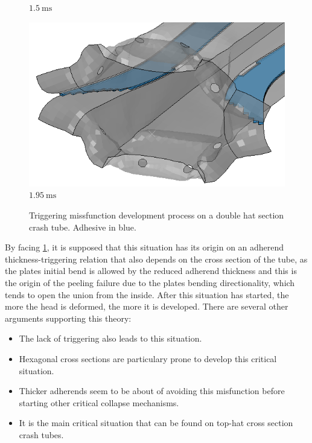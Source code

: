 \documentclass[
documentsize = a4, %
font = cmr, %
typesize = 11, %
printmode = true,
onehalfspacing = true,
language = en, %
titlepage = udciccp, %
degree = pt, %
dedication = true,
acknowledgements = true,
abstract-en = true,
abstract-es = false,
abstract-ga = false,
epigraphs = true,
toc = true,
lof = true,
lot = true,
frontmatterintoc = false,
notation = false,
minimal = false,
]{UDCthesis}
\begin{document}
\begin{figure}
\begin{minipage}[b]{.22\linewidth}
		$\SI{1.5}{\ms}$
	\end{minipage}
	\quad
	\begin{minipage}[b]{.22\linewidth}
		\centering
		\includegraphics[width=\linewidth]{IMG_CUTRES/tmf4}
		$\SI{1.95}{\ms}$
	\end{minipage}
	\caption[Triggering missfunction development process on a double hat section crash tube.]{Triggering missfunction development process on a double hat section crash tube. Adhesive in blue.}
	\label{fig:tmf}
\end{figure}

By facing \cref{fig:tmf}, it is supposed that this situation has its origin on an adherend thickness-triggering relation that also depends on the cross section of the tube, as the plates initial bend is allowed by the reduced adherend thickness and this is the origin of the peeling failure due to the plates bending directionality, which tends to open the union from the inside. After this situation has started, the more the head is deformed, the more it is developed. There are several other arguments supporting this theory:
\begin{itemize}
	\item The lack of triggering also leads to this situation.

	\item Hexagonal cross sections \citep{Yang2012} are particulary prone to develop this critical situation.

	\item Thicker adherends seem to be about of avoiding this misfunction before starting other critical collapse mechanisms.

	\item It is the main critical situation that can be found on top-hat cross section crash tubes.
\end{itemize}
\end{document}
